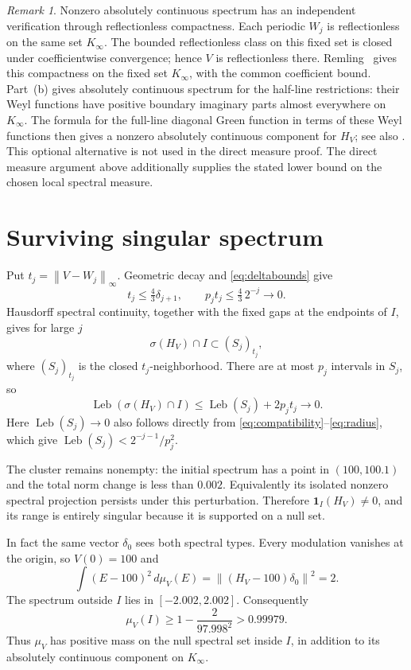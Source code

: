 \documentclass[11pt,a4paper]{article}
\numberwithin{equation}{section}
\theoremstyle{remark}
\newtheorem{remark}[theorem]{Remark}
\newcommand{\spec}{\sigma}
\newcommand{\Leb}{\operatorname{Leb}}
\newcommand{\dd}{\,d}
\newcommand{\norm}[1]{\left\lVert #1\right\rVert}
\begin{document}
\begin{remark}
Nonzero absolutely continuous spectrum has an independent
verification through reflectionless compactness. Each periodic
$W_j$ is reflectionless on the same set $K_\infty$.
The bounded reflectionless class on this fixed set is closed
under coefficientwise convergence; hence $V$ is reflectionless
there. Remling~\cite[Proposition~4.1(d)]{Remling} gives this compactness
on the fixed set $K_\infty$, with the common coefficient bound.
Part~(b) gives absolutely continuous spectrum for the half-line
restrictions: their Weyl functions have positive boundary imaginary
parts almost everywhere on $K_\infty$. The formula for the full-line
diagonal Green function in terms of these Weyl functions then gives a
nonzero absolutely continuous component for $H_V$; see also
\cite[Chapter~2]{Teschl}. This optional alternative is not used in the
direct measure proof.
The direct measure argument above additionally supplies the
stated lower bound on the chosen local spectral measure.
\end{remark}

\section{Surviving singular spectrum}
Put $t_j=\norm{V-W_j}_\infty$. Geometric decay and
\eqref{eq:deltabounds} give
\[
t_j\le\tfrac43\delta_{j+1},\qquad
p_jt_j\le\tfrac43\,2^{-j}\longrightarrow0.
\]
Hausdorff spectral continuity, together with the fixed
gaps at the endpoints of $I$, gives for large $j$
\[
\spec(H_V)\cap I\subset(S_j)_{t_j},
\]
where $(S_j)_{t_j}$ is the closed $t_j$-neighborhood.
There are at most $p_j$ intervals in $S_j$, so
\[
\Leb(\spec(H_V)\cap I)
\le\Leb(S_j)+2p_jt_j\longrightarrow0.
\]
Here $\Leb(S_j)\to0$ also follows directly from
\eqref{eq:compatibility}--\eqref{eq:radius}, which give
$\Leb(S_j)<2^{-j-1}/p_j^2$.

The cluster remains nonempty: the initial spectrum has
a point in $(100,100.1)$ and the total norm change is
less than $0.002$. Equivalently its isolated nonzero
spectral projection persists under this perturbation.
Therefore $\mathbf1_I(H_V)\ne0$, and its range is
entirely singular because it is supported on a null set.

In fact the same vector $\delta_0$ sees both spectral types.
Every modulation vanishes at the origin, so $V(0)=100$ and
\[
\int (E-100)^2\dd\mu_V(E)
=\norm{(H_V-100)\delta_0}^2=2.
\]
The spectrum outside $I$ lies in $[-2.002,2.002]$.
Consequently
\[
\mu_V(I)\ge1-\frac{2}{97.998^2}>0.99979.
\]
Thus $\mu_V$ has positive mass on the null spectral set
inside $I$, in addition to its absolutely continuous
component on $K_\infty$.
\end{document}
